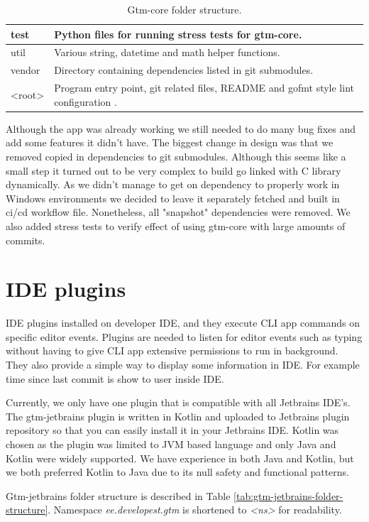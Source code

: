 \begin{table}[h]
\begin{tabular}{ | p{3cm} | p{10cm} |}
        \hline
        test & Python files for running stress tests for gtm-core.\\
        \hline
        util & Various string, datetime and math helper functions.\\
        \hline
        vendor & Directory containing dependencies listed in git submodules.\\
        \hline
        <root> & Program entry point, git related files, README and gofmt style lint configuration .\\
        \hline
    \end{tabular}
    \caption{Gtm-core folder structure.}
    \label{tab:gtm-core-folder-structure}
\end{table}

Although the app was already working we still needed to do many bug fixes and add some features it didn't have.
The biggest change in design was that we removed copied in dependencies to git submodules.
Although this seems like a small step it turned out to be very complex to build go linked with C library dynamically.
As we didn't manage to get on dependency to properly work in Windows environments we decided to leave it separately fetched and built in ci/cd workflow file.
Nonetheless, all "snapshot" dependencies were removed.
We also added stress tests to verify effect of using gtm-core with large amounts of commits.

\section{IDE plugins}\label{sec:ide-plugins}
IDE plugins installed on developer IDE, and they execute CLI app commands on specific editor events.
Plugins are needed to listen for editor events such as typing without having to give CLI app extensive permissions to run in background.
They also provide a simple way to display some information in IDE.
For example time since last commit is show to user inside IDE.

Currently, we only have one plugin that is compatible with all Jetbrains IDE's.
The gtm-jetbrains plugin is written in Kotlin and uploaded to Jetbrains plugin repository so that you can easily install it in your Jetbrains IDE.
Kotlin was chosen as the plugin was limited to JVM based language and only Java and Kotlin were widely supported.
We have experience in both Java and Kotlin, but we both preferred Kotlin to Java due to its null safety and functional patterns.

Gtm-jetbrains folder structure is described in Table
\ref{tab:gtm-jetbrains-folder-structure}.
Namespace \textit{ee.developest.gtm} is shortened to \textit{<ns>} for readability.

